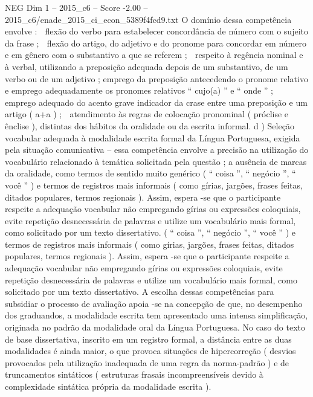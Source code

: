 \begin{textsample}{NEG Dim 1 – 2015\_c6 – Score -2.00 – 2015\_c6/enade\_2015\_ci\_econ\_5389f4fcd9.txt}
O domínio dessa competência envolve :  flexão do verbo para estabelecer concordância de número com o sujeito da frase ;  flexão do artigo, do adjetivo e do pronome para concordar em número e em gênero com o substantivo a que se referem ;  respeito à regência nominal e à verbal, utilizando a preposição adequada depois de um substantivo, de um verbo ou de um adjetivo ; emprego da preposição antecedendo o pronome relativo e emprego adequadamente os pronomes relativos “ cujo(a) ” e “ onde ” ;  emprego adequado do acento grave indicador da crase entre uma preposição e um artigo ( a+a ) ;  atendimento às regras de colocação pronominal ( próclise e ênclise ), distintas dos hábitos da oralidade ou da escrita informal. d ) Seleção vocabular adequada à modalidade escrita formal da Língua Portuguesa, exigida pela situação comunicativa – essa competência envolve a precisão na utilização do vocabulário relacionado à temática solicitada pela questão ; a ausência de marcas da oralidade, como termos de sentido muito genérico ( “ coisa ”, “ negócio ”, “ você ” ) e termos de registros mais informais ( como gírias, jargões, frases feitas, ditados populares, termos regionais ).
Assim, espera -se que o participante respeite a adequação vocabular não empregando gírias ou expressões coloquiais, evite repetição desnecessária de palavras e utilize um vocabulário mais formal, como solicitado por um texto dissertativo. ( “ coisa ”, “ negócio ”, “ você ” ) e termos de registros mais informais ( como gírias, jargões, frases feitas, ditados populares, termos regionais ).
Assim, espera -se que o participante respeite a adequação vocabular não empregando gírias ou expressões coloquiais, evite repetição desnecessária de palavras e utilize um vocabulário mais formal, como solicitado por um texto dissertativo.
A escolha dessas competências para subsidiar o processo de avaliação apoia -se na concepção de que, no desempenho dos graduandos, a modalidade escrita tem apresentado uma intensa simplificação, originada no padrão da modalidade oral da Língua Portuguesa.
No caso do texto de base dissertativa, inscrito em um registro formal, a distância entre as duas modalidades é ainda maior, o que provoca situações de hipercorreção ( desvios provocados pela utilização inadequada de uma regra da norma-padrão ) e de truncamentos sintáticos ( estruturas frasais incompreensíveis devido à complexidade sintática própria da modalidade escrita ).

\end{textsample}
